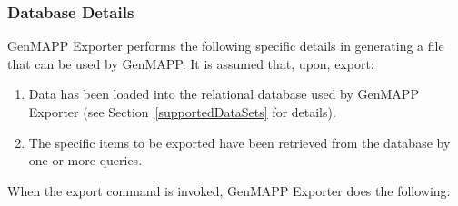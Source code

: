 \documentclass[11pt]{article}
\begin{document}
\subsubsection{Database Details}

GenMAPP Exporter performs the following specific details in generating a file that can be used by GenMAPP.  It is assumed that, upon, export:
\begin{enumerate}
\item Data has been loaded into the relational database used by GenMAPP Exporter (see Section~\ref{supportedDataSets} for details).

\item The specific items to be exported have been retrieved from the database by one or more queries.
\end{enumerate}
When the export command is invoked, GenMAPP Exporter does the following:
\end{document}

